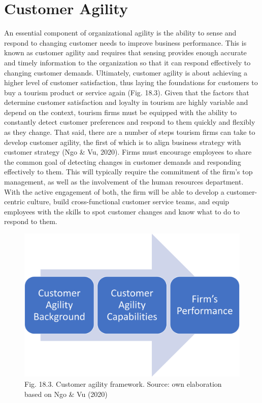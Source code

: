 \documentclass[
  letterpaper,
  DIV=11,
  numbers=noendperiod]{scrreprt}
\begin{document}
\hypertarget{customer-agility}{%
\section{Customer Agility}\label{customer-agility}}

An essential component of organizational agility is the ability to sense
and respond to changing customer needs to improve business performance.
This is known as customer agility and requires that sensing provides
enough accurate and timely information to the organization so that it
can respond effectively to changing customer demands. Ultimately,
customer agility is about achieving a higher level of customer
satisfaction, thus laying the foundations for customers to buy a tourism
product or service again (Fig. 18.3). Given that the factors that
determine customer satisfaction and loyalty in tourism are highly
variable and depend on the context, tourism firms must be equipped with
the ability to constantly detect customer preferences and respond to
them quickly and flexibly as they change. That said, there are a number
of steps tourism firms can take to develop customer agility, the first
of which is to align business strategy with customer strategy (Ngo \&
Vu, 2020). Firms must encourage employees to share the common goal of
detecting changes in customer demands and responding effectively to
them. This will typically require the commitment of the firm's top
management, as well as the involvement of the human resources
department. With the active engagement of both, the firm will be able to
develop a customer-centric culture, build cross-functional customer
service teams, and equip employees with the skills to spot customer
changes and know what to do to respond to them.

\begin{figure}

{\centering \includegraphics[width=6.25in,height=\textheight]{img/fig30.png}

}

\caption{Fig. 18.3. Customer agility framework. Source: own elaboration
based on Ngo \& Vu (2020)}

\end{figure}
\end{document}
